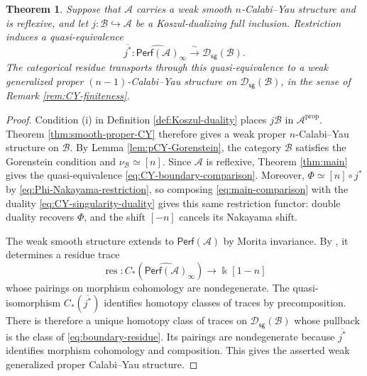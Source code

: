 \documentclass[11pt,letterpaper,reqno]{amsart}
\theoremstyle{plain}
\newtheorem{theorem}{Theorem}[section]
\theoremstyle{definition}
\theoremstyle{plain}
\theoremstyle{definition}
\numberwithin{equation}{section}
\begin{document}
\begin{theorem}\label{thm:koszul-CY-comparison}
Suppose that $\mathscr A$ carries a weak smooth $n$-Calabi--Yau structure and is reflexive, and let $j:\mathscr B\hookrightarrow\mathscr A$ be a Koszul-dualizing full inclusion.
Restriction induces a quasi-equivalence
\begin{equation}\label{eq:CY-boundary-comparison}
\overline{j^*}:\widehat{\mathsf{Perf}(\mathscr A)}_{\infty}
\xrightarrow{\;\sim\;}\mathscr D_{\mathsf{sg}}(\mathscr B).
\end{equation}
The categorical residue transports through this quasi-equivalence to a weak generalized proper $(n-1)$-Calabi--Yau structure on $\mathscr D_{\mathsf{sg}}(\mathscr B)$, in the sense of Remark \ref{rem:CY-finiteness}.
\end{theorem}
\begin{proof}
Condition (i) in Definition \ref{def:Koszul-duality} places $j\mathscr B$ in $\mathscr A^{\mathrm{prop}}$.
Theorem \ref{thm:smooth-proper-CY} therefore gives a weak proper $n$-Calabi--Yau structure on $\mathscr B$.
By Lemma \ref{lem:pCY-Gorenstein}, the category $\mathscr B$ satisfies the Gorenstein condition and $\nu_{\mathscr B}\simeq[n]$.
Since $\mathscr A$ is reflexive, Theorem \ref{thm:main} gives the quasi-equivalence \eqref{eq:CY-boundary-comparison}.
Moreover, $\Phi\simeq[n]\circ j^*$ by \eqref{eq:Phi-Nakayama-restriction}, so composing \eqref{eq:main-comparison} with the duality \eqref{eq:CY-singularity-duality} gives this same restriction functor: double duality recovers $\Phi$, and the shift $[-n]$ cancels its Nakayama shift.

The weak smooth structure extends to $\mathsf{Perf}(\mathscr A)$ by Morita invariance.
By \cite[Theorem 1.7 and equation (3.67)]{Gao2025}, it determines a residue trace
\begin{equation}\label{eq:boundary-residue}
\operatorname{res}:C_*(\widehat{\mathsf{Perf}(\mathscr A)}_{\infty})
\longrightarrow\Bbbk[1-n]
\end{equation}
whose pairings on morphism cohomology are nondegenerate.
The quasi-isomorphism $C_*(\overline{j^*})$ identifies homotopy classes of traces by precomposition.
There is therefore a unique homotopy class of traces on $\mathscr D_{\mathsf{sg}}(\mathscr B)$ whose pullback is the class of \eqref{eq:boundary-residue}.
Its pairings are nondegenerate because $\overline{j^*}$ identifies morphism cohomology and composition.
This gives the asserted weak generalized proper Calabi--Yau structure.
\end{proof}
\end{document}
